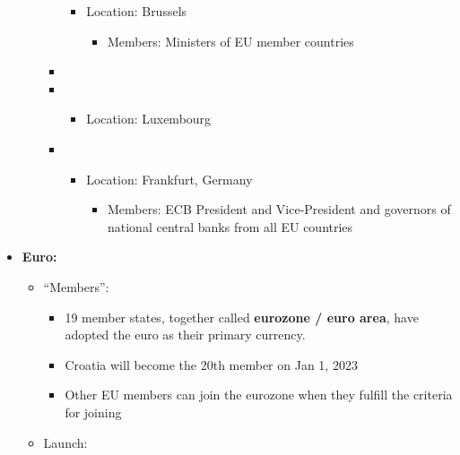 \documentclass[
  10pt,
  ignorenonframetext,
  progressbar=frametitle]{beamer}
\providecommand{\tightlist}{%
  \setlength{\itemsep}{0pt}\setlength{\parskip}{0pt}}
\begin{document}
\begin{frame}[allowframebreaks]
\begin{itemize}
\begin{itemize}
\begin{itemize}
      \begin{itemize}
      \tightlist
      \item
        Location: Brussels

        \begin{itemize}
        \tightlist
        \item
          Members: Ministers of EU member countries
        \end{itemize}
      \end{itemize}
    \item
    \item

      \begin{itemize}
      \tightlist
      \item
        Location: Luxembourg
      \end{itemize}
    \item

      \begin{itemize}
      \tightlist
      \item
        Location: Frankfurt, Germany

        \begin{itemize}
        \tightlist
        \item
          Members: ECB President and Vice-President and governors of
          national central banks from all EU countries
        \end{itemize}
      \end{itemize}
    \end{itemize}
  \end{itemize}
\item
  \textbf{Euro:}

  \begin{itemize}
  \tightlist
  \item
    ``Members'':

    \begin{itemize}
    \tightlist
    \item
      19 member states, together called \textbf{eurozone / euro area},
      have adopted the euro as their primary currency.
    \item
      Croatia will become the 20th member on Jan 1, 2023
    \item
      Other EU members can join the eurozone when they fulfill the
      criteria for joining
    \end{itemize}
  \item
    Launch:


\end{itemize}
\end{itemize}
\end{frame}
\end{document}
